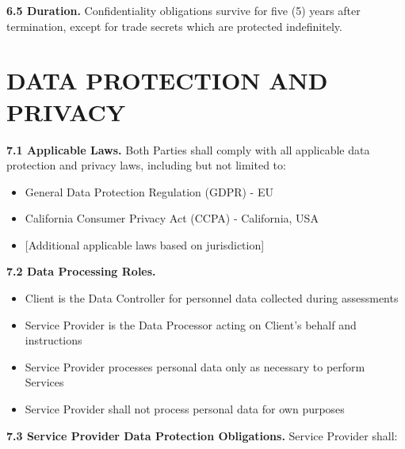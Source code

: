 \documentclass[11pt,a4paper]{article}
\begin{document}
\textbf{6.5 Duration.} Confidentiality obligations survive for five (5) years after termination, except for trade secrets which are protected indefinitely.

\section{DATA PROTECTION AND PRIVACY}

\textbf{7.1 Applicable Laws.} Both Parties shall comply with all applicable data protection and privacy laws, including but not limited to:
\begin{itemize}
\item General Data Protection Regulation (GDPR) - EU
\item California Consumer Privacy Act (CCPA) - California, USA
\item {[Additional applicable laws based on jurisdiction]}
\end{itemize}

\textbf{7.2 Data Processing Roles.}
\begin{itemize}
\item Client is the Data Controller for personnel data collected during assessments
\item Service Provider is the Data Processor acting on Client's behalf and instructions
\item Service Provider processes personal data only as necessary to perform Services
\item Service Provider shall not process personal data for own purposes
\end{itemize}

\textbf{7.3 Service Provider Data Protection Obligations.} Service Provider shall:
\end{document}
